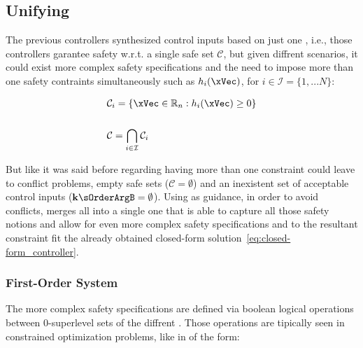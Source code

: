 \subsection{Unifying }
\label{sub:unifying_CBF}

The previous controllers synthesized control inputs based on just one , i.e., those controllers garantee safety w.r.t. a single safe set \(\mathcal{C}\), but given diffrent scenarios, it could exist more complex safety specifications and the need to impose more than one safety contraints simultaneously such as  \(h_i(\xVec)\), for \(i \in  \mathcal{I}=\{1,...N\}\):

\begin{align}
    & \mathcal{C}_i = \{ \xVec \in \mathbb{R}_n: h_i(\xVec) \geq 0\}
    \label{eq:Multiple_Safe_Sets} \\ 
    \notag\\
    & \mathcal{C} = \bigcap_{i \in \mathcal{I}} \mathcal{C}_i 
    \label{eq:Safe_Set_of_multiple}
\end{align}

But like it was said before regarding having more than one constraint could leave to conflict problems, empty safe sets (\(\mathcal{C} = \emptyset\)) and an inexistent set of acceptable control inputs (\(\mathbf{k}\sOrderArgB = \emptyset\)). Using \cite{molnar2023composing} as guidance, in order to avoid conflicts, merges all  into a single one that is able to capture all those safety notions and allow for even more complex safety specifications and to the resultant constraint fit the already obtained  closed-form solution~\ref{eq:closed-form_controller}. \\


\subsubsection{First-Order System}
\label{subsub:uniCBF_firstOrder_system}

The more complex safety specifications are defined via boolean logical operations between 0-superlevel sets of the diffrent . Those operations are tipically seen in constrained optimization problems, like in  of the form:


